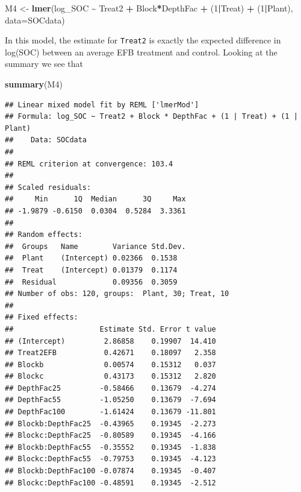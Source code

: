 \documentclass[
]{article}
\newenvironment{Shaded}{\begin{snugshade}}{\end{snugshade}}
\newcommand{\AttributeTok}[1]{\textcolor[rgb]{0.13,0.29,0.53}{#1}}
\newcommand{\DecValTok}[1]{\textcolor[rgb]{0.00,0.00,0.81}{#1}}
\newcommand{\FunctionTok}[1]{\textcolor[rgb]{0.13,0.29,0.53}{\textbf{#1}}}
\newcommand{\NormalTok}[1]{#1}
\newcommand{\OtherTok}[1]{\textcolor[rgb]{0.56,0.35,0.01}{#1}}
\newcommand{\SpecialCharTok}[1]{\textcolor[rgb]{0.81,0.36,0.00}{\textbf{#1}}}
\begin{document}
\begin{Shaded}
\begin{Highlighting}[]
\NormalTok{M4 }\OtherTok{\textless{}{-}} \FunctionTok{lmer}\NormalTok{(log\_SOC }\SpecialCharTok{\textasciitilde{}}\NormalTok{ Treat2 }\SpecialCharTok{+}\NormalTok{ Block}\SpecialCharTok{*}\NormalTok{DepthFac }\SpecialCharTok{+}\NormalTok{ (}\DecValTok{1}\SpecialCharTok{|}\NormalTok{Treat) }\SpecialCharTok{+}\NormalTok{ (}\DecValTok{1}\SpecialCharTok{|}\NormalTok{Plant),}
\AttributeTok{data=}\NormalTok{SOCdata)}
\end{Highlighting}
\end{Shaded}

In this model, the estimate for \texttt{Treat2} is exactly the expected
difference in log(SOC) between an average EFB treatment and control.
Looking at the summary we see that

\begin{Shaded}
\begin{Highlighting}[]
\FunctionTok{summary}\NormalTok{(M4)}
\end{Highlighting}
\end{Shaded}

\begin{verbatim}
## Linear mixed model fit by REML ['lmerMod']
## Formula: log_SOC ~ Treat2 + Block * DepthFac + (1 | Treat) + (1 | Plant)
##    Data: SOCdata
## 
## REML criterion at convergence: 103.4
## 
## Scaled residuals: 
##     Min      1Q  Median      3Q     Max 
## -1.9879 -0.6150  0.0304  0.5284  3.3361 
## 
## Random effects:
##  Groups   Name        Variance Std.Dev.
##  Plant    (Intercept) 0.02366  0.1538  
##  Treat    (Intercept) 0.01379  0.1174  
##  Residual             0.09356  0.3059  
## Number of obs: 120, groups:  Plant, 30; Treat, 10
## 
## Fixed effects:
##                    Estimate Std. Error t value
## (Intercept)         2.86858    0.19907  14.410
## Treat2EFB           0.42671    0.18097   2.358
## Blockb              0.00574    0.15312   0.037
## Blockc              0.43173    0.15312   2.820
## DepthFac25         -0.58466    0.13679  -4.274
## DepthFac55         -1.05250    0.13679  -7.694
## DepthFac100        -1.61424    0.13679 -11.801
## Blockb:DepthFac25  -0.43965    0.19345  -2.273
## Blockc:DepthFac25  -0.80589    0.19345  -4.166
## Blockb:DepthFac55  -0.35552    0.19345  -1.838
## Blockc:DepthFac55  -0.79753    0.19345  -4.123
## Blockb:DepthFac100 -0.07874    0.19345  -0.407
## Blockc:DepthFac100 -0.48591    0.19345  -2.512
\end{verbatim}
\end{document}
